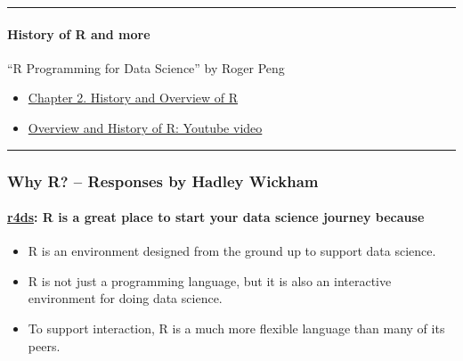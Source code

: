 \documentclass[
]{article}
\providecommand{\tightlist}{%
  \setlength{\itemsep}{0pt}\setlength{\parskip}{0pt}}
\begin{document}
\begin{center}\rule{0.5\linewidth}{0.5pt}\end{center}

\hypertarget{history-of-r-and-more}{%
\paragraph{History of R and more}\label{history-of-r-and-more}}

``R Programming for Data Science'' by Roger Peng

\begin{itemize}
\tightlist
\item
  \href{https://bookdown.org/rdpeng/rprogdatascience/history-and-overview-of-r.html}{Chapter
  2. History and Overview of R}
\item
  \href{https://www.youtube.com/watch?v=STihTnVSZnI\&feature=youtu.be}{Overview
  and History of R: Youtube video}
\end{itemize}

\begin{center}\rule{0.5\linewidth}{0.5pt}\end{center}

\hypertarget{why-r-responses-by-hadley-wickham}{%
\subsubsection{Why R? -- Responses by Hadley
Wickham}\label{why-r-responses-by-hadley-wickham}}

\hypertarget{r4ds-r-is-a-great-place-to-start-your-data-science-journey-because}{%
\paragraph{\texorpdfstring{\href{https://r4ds.had.co.nz/introduction.html\#python-julia-and-friends}{r4ds}:
R is a great place to start your data science journey
because}{r4ds: R is a great place to start your data science journey because}}\label{r4ds-r-is-a-great-place-to-start-your-data-science-journey-because}}

\begin{itemize}
\tightlist
\item
  R is an environment designed from the ground up to support data
  science.
\item
  R is not just a programming language, but it is also an interactive
  environment for doing data science.
\item
  To support interaction, R is a much more flexible language than many
  of its peers.
\end{itemize}
\end{document}
